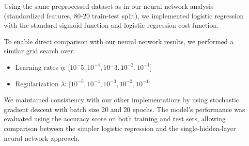 Using the same preprocessed dataset as in our neural network analysis (standardized features, 80-20 train-test split), we implemented logistic regression with the standard sigmoid function and logistic regression cost function.

To enable direct comparison with our neural network results, we performed a similar grid search over:

\begin{itemize}
    \item Learning rates \( \eta \): [\( 10^-{5,} 10^{-4}, 10{^-}3, 10^{-2}, 10^{-1} \)]
    \item Regularization \( \lambda \): [\( 10^{-5}, 10^{-4}, 10^{-3}, 10^{-2}, 10^{-1} \)]
\end{itemize}
We maintained consistency with our other implementations by using stochastic gradient descent with batch size 20 and 20 epochs. The model's performance was evaluated using the accuracy score on both training and test sets, allowing comparison between the simpler logistic regression and the single-hidden-layer neural network approach.






